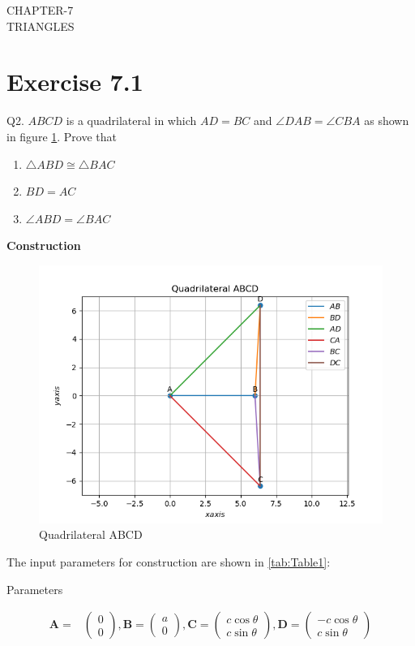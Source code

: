 \documentclass{article}
\newcommand{\myvec}[1]{\ensuremath{\begin{pmatrix}#1\end{pmatrix}}}
\let\vec\mathbf
\begin{document}
\begin{center}
        \textbf\large{CHAPTER-7 \\ TRIANGLES}
\end{center}
\section{Exercise 7.1}
Q2. $ABCD$ is a quadrilateral in which $AD = BC$ and $\angle{DAB} = \angle{CBA}$ as shown in figure \ref{fig:Fig}. Prove that
\begin{enumerate}
\item $\triangle{ABD} \cong \triangle{BAC}$
  \item $BD = AC$
  \item $\angle{ABD} = \angle{BAC}$
\end{enumerate}
\textbf{Construction}\\
\begin{figure}[h!]
	\begin{center}
		\includegraphics[width=\columnwidth]{figs/fig.png}
	\end{center}
	\caption{Quadrilateral ABCD}
	\label{fig:Fig}
\end{figure}
The input parameters for construction are shown in \ref{tab:Table1}:\\
\begin{table}[h!]
    \centering
    
    \caption{Parameters}
    \label{tab:Table1}
\end{table}
\pagebreak
\begin{align}
\vec{A} =& \myvec{0\\0},\vec{B} = \myvec{a\\0},\vec{C} = \myvec{c\cos\theta\\c\sin\theta},\vec{D} = \myvec{-c\cos\theta\\c\sin\theta}
\end{align}
\end{document}
